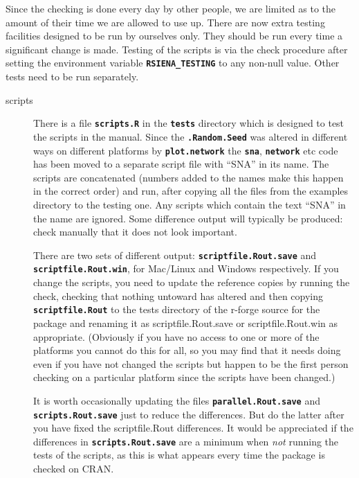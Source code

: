 \documentclass[12pt, a4paper]{article}
\renewcommand{\=}{\,=\,}
\newcommand{\+}{\,+\,}
\newcommand{\sfn}[1]{\textbf{\texttt{#1}}}
\begin{document}
Since the checking is done every day by other people, we are limited as to the
amount of their time we are allowed to use up. There are now extra testing
facilities designed to be run by ourselves only. They should be run every time a
significant change is made.  Testing of the scripts is via the check procedure
after setting the environment variable \sfn{RSIENA\_TESTING} to any non-null
value. Other tests need to be run separately.
\label{sec:tests}
\begin{description}
\item[scripts] There is a file \sfn{scripts.R} in the \sfn{tests} directory
  which is designed to test the scripts in the manual. Since the
 \sfn{.Random.Seed} was altered in different ways on different platforms by
  \sfn{plot.network} the \sfn{sna}, \sfn{network} etc code has been moved to a
  separate script file with ``SNA'' in its name.  The
  scripts are concatenated (numbers added to the names make this happen in
  the correct order) and run, after copying all the files from the examples
  directory to the testing one. Any scripts which contain the text ``SNA'' in the
  name are ignored. Some difference output will typically be produced: check
  manually that it does not look important.

  There are two sets of different output: \sfn{scriptfile.Rout.save} and
  \sfn{scriptfile.Rout.win}, for Mac/Linux and Windows respectively. If you
  change the scripts, you need to update the reference copies by running the
  check, checking that nothing untoward has altered and then copying
  \sfn{scriptfile.Rout} to the tests directory of the r-forge source for the
  package and renaming it as scriptfile.Rout.save or scriptfile.Rout.win as
  appropriate. (Obviously if you have no access to one or more of the platforms
  you cannot do this for all, so you may find that it needs doing even if you
  have not changed the scripts but happen to be the first person checking on a
  particular platform since the scripts have been changed.)

  It is worth occasionally updating the files \sfn{parallel.Rout.save} and
  \sfn{scripts.Rout.save} just to reduce the differences. But do the latter
  after you have fixed the scriptfile.Rout differences. It would be appreciated
  if the differences in \sfn{scripts.Rout.save} are a minimum when \emph{not}
  running the tests of the scripts, as this is what appears every time the
  package is checked on CRAN.


\end{description}
\end{document}
